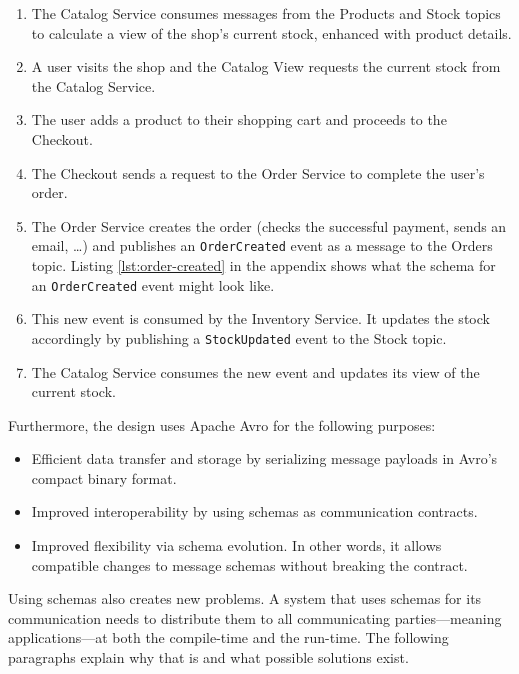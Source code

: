 \begin{enumerate}
  \item The Catalog Service consumes messages from the Products and Stock topics to calculate a view of the shop's current stock, enhanced with product details.
  \item A user visits the shop and the Catalog View requests the current stock from the Catalog Service.
  \item The user adds a product to their shopping cart and proceeds to the Checkout.
  \item The Checkout sends a request to the Order Service to complete the user's order.
  \item The Order Service creates the order (checks the successful payment, sends an email, \ldots) and publishes an \texttt{OrderCreated} event as a message to the Orders topic.
  Listing \ref{lst:order-created} in the appendix shows what the schema for an \texttt{OrderCreated} event might look like.
  \item This new event is consumed by the Inventory Service. It updates the stock accordingly by publishing a \texttt{StockUpdated} event to the Stock topic.
  \item The Catalog Service consumes the new event and updates its view of the current stock.
\end{enumerate}

Furthermore, the design uses Apache Avro for the following purposes:

\begin{itemize}
  \item Efficient data transfer and storage by serializing message payloads in Avro's compact binary format.
  \item Improved interoperability by using schemas as communication contracts.
  \item Improved flexibility via schema evolution. In other words, it allows compatible changes to message schemas without breaking the contract.
\end{itemize}

Using schemas also creates new problems.
A system that uses schemas for its communication needs to distribute them to all communicating parties---meaning applications---at both the compile-time and the run-time.
The following paragraphs explain why that is and what possible solutions exist.


